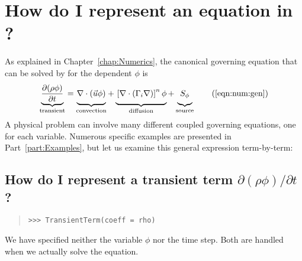 \minitoc[e]
    
    \section{How do I represent an equation in \FiPy{}?}
    
    As explained in Chapter~\ref{chap:Numerics}, the canonical
    governing equation that can be solved by \FiPy{} for the dependent
     $\phi$ is
        \begin{equation}                        
             \underbrace{
               \frac{\partial (\rho \phi)}{\partial t}
             }_{\text{transient}}
             =
             \underbrace{
               \vphantom{\frac{\partial (\rho \phi)}{\partial t}}
               \nabla \cdot \left( \vec{u} \phi \right)
             }_{\text{convection}}
             +
             \underbrace{
               \vphantom{\frac{\partial (\rho \phi)}{\partial t}}
               \left[ \nabla \cdot \left( \Gamma_i \nabla \right) \right]^n \phi
             }_{\text{diffusion}}
             +
             \underbrace{
               \vphantom{\frac{\partial (\rho \phi)}{\partial t}}
               S_{\phi}
             }_{\text{source}}
             \tag{\ref{eqn:num:gen}}
        \end{equation}
        A physical problem can involve many different coupled
        governing equations, one for each variable.  Numerous specific
        examples are presented in Part~\ref{part:Examples}, but let us
        examine this general expression term-by-term:
        
            \subsection{How do I represent a transient term 
            $\partial (\rho \phi) / \partial t$?}
            \hspace*{\fill}
            
            \begin{quote}
\begin{verbatim}
>>> TransientTerm(coeff = rho)
\end{verbatim}
            \end{quote}
          
            \begin{reSTadmonition}[Note]
                We have specified neither the variable $\phi$ nor the time
                step.  Both are handled when we actually solve the equation.
            \end{reSTadmonition}
            
